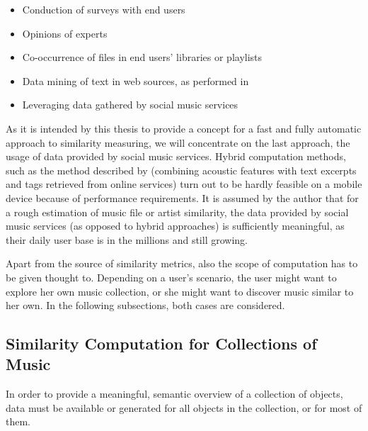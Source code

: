\begin{itemize}
	\item Conduction of surveys with end users
	\item Opinions of experts
	\item Co-occurrence of files in end users' libraries or playlists
	\item Data mining of text in web sources, as performed in \cite{Whitman02inferringdescriptions}
	\item Leveraging data gathered by social music services
\end{itemize}

As it is intended by this thesis to provide a concept for a fast and fully automatic approach to similarity
measuring, we will concentrate on the last approach, the usage of data provided by social music services.
Hybrid computation methods, such as the method described by \cite{mcfee09_hesas} (combining acoustic 
features with text excerpts and tags retrieved from online services) turn out to be hardly feasible on a 
mobile device because of performance requirements. It is assumed by the author that for a rough estimation 
of music file or artist similarity, the data provided by social music services (as opposed to hybrid 
approaches) is sufficiently meaningful, as their daily user base is in the millions and still growing.

Apart from the source of similarity metrics, also the scope of computation has to be given thought to.
Depending on a user's scenario, the user might want to explore her own music collection, or she might want
to discover music similar to her own. In the following subsections, both cases are considered.

\subsection{Similarity Computation for Collections of Music}

In order to provide a meaningful, semantic overview of a collection of objects, data must be available 
or generated for all objects in the collection, or for most of them. 

